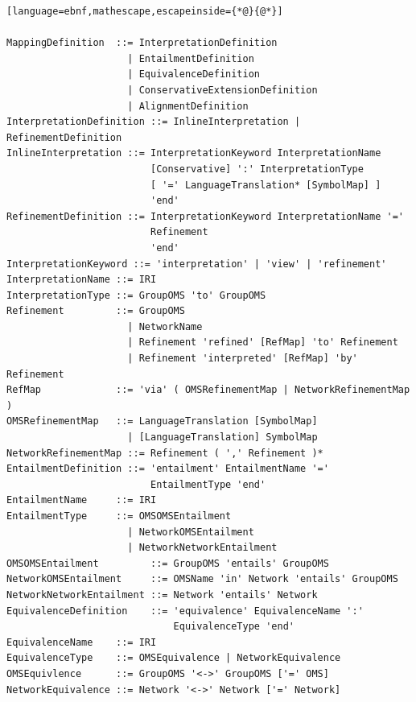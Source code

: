 \documentclass[10pt, a4paper]{isov2}
\begin{document}

\label{a:dol-text:mappings}

\vspace{-2em}
\begin{lstlisting}[language=ebnf,mathescape,escapeinside={*@}{@*}]

MappingDefinition  ::= InterpretationDefinition
                     | EntailmentDefinition
                     | EquivalenceDefinition
                     | ConservativeExtensionDefinition
                     | AlignmentDefinition
InterpretationDefinition ::= InlineInterpretation | RefinementDefinition
InlineInterpretation ::= InterpretationKeyword InterpretationName
                         [Conservative] ':' InterpretationType
                         [ '=' LanguageTranslation* [SymbolMap] ]
                         'end'
RefinementDefinition ::= InterpretationKeyword InterpretationName '='
                         Refinement
                         'end'
InterpretationKeyword ::= 'interpretation' | 'view' | 'refinement'
InterpretationName ::= IRI
InterpretationType ::= GroupOMS 'to' GroupOMS
Refinement         ::= GroupOMS
                     | NetworkName
                     | Refinement 'refined' [RefMap] 'to' Refinement
                     | Refinement 'interpreted' [RefMap] 'by' Refinement
RefMap             ::= 'via' ( OMSRefinementMap | NetworkRefinementMap )
OMSRefinementMap   ::= LanguageTranslation [SymbolMap]
                     | [LanguageTranslation] SymbolMap
NetworkRefinementMap ::= Refinement ( ',' Refinement )*
EntailmentDefinition ::= 'entailment' EntailmentName '='
                         EntailmentType 'end'
EntailmentName     ::= IRI
EntailmentType     ::= OMSOMSEntailment
                     | NetworkOMSEntailment
                     | NetworkNetworkEntailment
OMSOMSEntailment         ::= GroupOMS 'entails' GroupOMS
NetworkOMSEntailment     ::= OMSName 'in' Network 'entails' GroupOMS
NetworkNetworkEntailment ::= Network 'entails' Network
EquivalenceDefinition    ::= 'equivalence' EquivalenceName ':'
                             EquivalenceType 'end'
EquivalenceName    ::= IRI
EquivalenceType    ::= OMSEquivalence | NetworkEquivalence
OMSEquivlence      ::= GroupOMS '<->' GroupOMS ['=' OMS]
NetworkEquivalence ::= Network '<->' Network ['=' Network]

\end{lstlisting}
\end{document}
